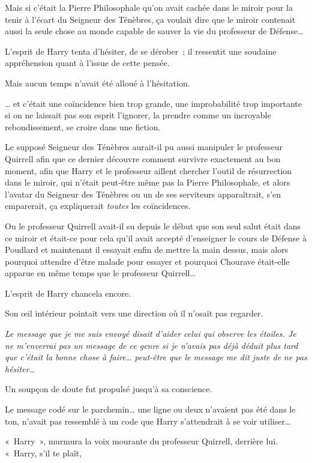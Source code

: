 Mais si c'était la Pierre Philosophale qu'on avait cachée dans le miroir pour la tenir à l'écart du Seigneur des Ténèbres, ça voulait dire que le miroir contenait aussi la seule chose au monde capable de sauver la vie du professeur de Défense…

L'esprit de Harry tenta d'hésiter, de se dérober~; il ressentit une soudaine appréhension quant à l'issue de cette pensée.

Mais aucun temps n'avait été alloué à l'hésitation.

… et c'était une coïncidence bien trop grande, une improbabilité trop importante si on ne laissait pas son esprit l'ignorer, la prendre comme un incroyable rebondissement, se croire dans une fiction.

Le supposé Seigneur des Ténèbres aurait-il pu aussi manipuler le professeur Quirrell afin que ce dernier découvre comment survivre exactement au bon moment, afin que Harry et le professeur aillent chercher l'outil de résurrection dans le miroir, qui n'était peut-être même pas la Pierre Philosophale, et alors l'avatar du Seigneur des Ténèbres ou un de ses serviteurs apparaîtrait, s'en emparerait, ça expliquerait \emph{toutes} les coïncidences.

Ou le professeur Quirrell avait-il su depuis le début que son seul salut était dans ce miroir et était-ce pour cela qu'il avait accepté d'enseigner le cours de Défense à Poudlard et maintenant il essayait enfin de mettre la main dessus, mais alors pourquoi attendre d'être malade pour essayer et pourquoi Chourave était-elle apparue en même temps que le professeur Quirrell…

L'esprit de Harry chancela encore.

Son œil intérieur pointait vers une direction où il n'osait pas regarder.

\emph{Le message que je me suis envoyé disait d'aider celui qui observe les étoiles.
Je ne m'enverrai pas un message de ce genre si je n'avais pas déjà déduit plus tard que c'était la bonne chose à faire… peut-être que le message me dit juste de ne pas hésiter…}

Un soupçon de doute fut propulsé jusqu'à sa conscience.

Le message codé sur le parchemin… une ligne ou deux n'avaient pas été dans le ton, n'avait pas ressemblé à un code que Harry s'attendrait à se voir utiliser…

«~Harry~», murmura la voix mourante du professeur Quirrell, derrière lui.
«~Harry, s'il te plaît,


